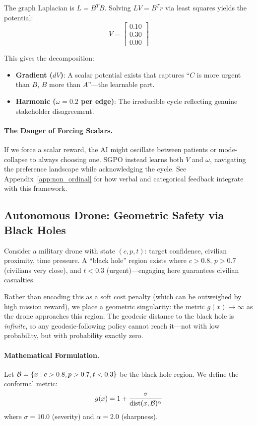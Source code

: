 The graph Laplacian is $L = B^T B$. Solving $L V = B^T r$ via least squares yields the potential:
\begin{equation}
V = \begin{bmatrix} 0.10 \\ 0.30 \\ 0.00 \end{bmatrix}
\end{equation}

This gives the decomposition:
\begin{itemize}
    \item \textbf{Gradient ($dV$)}: A scalar potential exists that captures ``$C$ is more urgent than $B$, $B$ more than $A$''---the learnable part.
    \item \textbf{Harmonic ($\omega = 0.2$ per edge)}: The irreducible cycle reflecting genuine stakeholder disagreement.
\end{itemize}

\paragraph{The Danger of Forcing Scalars.}
If we force a scalar reward, the AI might oscillate between patients or mode-collapse to always choosing one. SGPO instead learns both $V$ and $\omega$, navigating the preference landscape while acknowledging the cycle. See Appendix~\ref{app:non_ordinal} for how verbal and categorical feedback integrate with this framework.

\subsection{Autonomous Drone: Geometric Safety via Black Holes}

Consider a military drone with state $(c, p, t)$: target confidence, civilian proximity, time pressure. A ``black hole'' region exists where $c > 0.8$, $p > 0.7$ (civilians very close), and $t < 0.3$ (urgent)---engaging here guarantees civilian casualties.

Rather than encoding this as a soft cost penalty (which can be outweighed by high mission reward), we place a geometric singularity: the metric $g(x) \to \infty$ as the drone approaches this region. The geodesic distance to the black hole is \emph{infinite}, so any geodesic-following policy cannot reach it---not with low probability, but with probability exactly zero.

\paragraph{Mathematical Formulation.}
Let $\mathcal{B} = \{x : c > 0.8, p > 0.7, t < 0.3\}$ be the black hole region. We define the conformal metric:
\begin{equation}
g(x) = 1 + \frac{\sigma}{\text{dist}(x, \mathcal{B})^\alpha}
\end{equation}
where $\sigma = 10.0$ (severity) and $\alpha = 2.0$ (sharpness).

